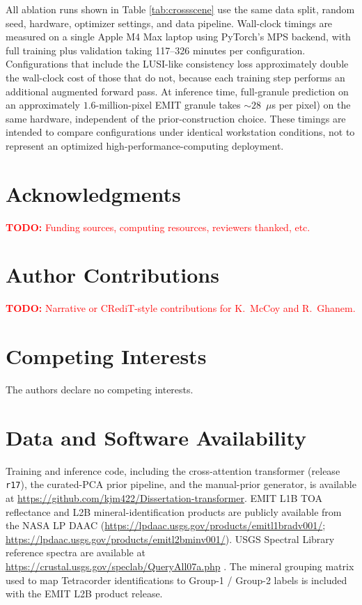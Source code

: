 \documentclass[11pt]{article}
\begin{document}
All ablation runs shown in Table \ref{tab:crossscene} use the same data split, random seed, hardware, optimizer settings, and data pipeline.
Wall-clock timings are measured on a single Apple M4 Max laptop using PyTorch's MPS backend, with full training plus validation taking 117--326 minutes per configuration.
Configurations that include the LUSI-like consistency loss approximately double the wall-clock cost of those that do not, because each training step performs an additional augmented forward pass.
At inference time, full-granule prediction on an approximately $1.6$-million-pixel EMIT granule takes $\sim$$28$~$\mu$s per pixel) on the same hardware, independent of the prior-construction choice.
These timings are intended to compare configurations under identical workstation conditions, not to represent an optimized high-performance-computing deployment.

\section*{Acknowledgments}
\textcolor{red}{\textbf{TODO:} Funding sources, computing resources, reviewers thanked, etc.}

\section*{Author Contributions}
\textcolor{red}{\textbf{TODO:} Narrative or CRediT-style contributions for K.~McCoy and R.~Ghanem.}

\section*{Competing Interests}
The authors declare no competing interests.

\section*{Data and Software Availability}
Training and inference code, including the cross-attention transformer (release \texttt{r17}), the curated-PCA prior pipeline, and the manual-prior generator, is available at \url{https://github.com/kjm422/Dissertation-transformer}.
EMIT L1B TOA reflectance and L2B mineral-identification products are publicly available from the NASA LP DAAC (\url{https://lpdaac.usgs.gov/products/emitl1bradv001/}; \url{https://lpdaac.usgs.gov/products/emitl2bminv001/}).
USGS Spectral Library reference spectra are available at \url{https://crustal.usgs.gov/speclab/QueryAll07a.php} \cite{kokaly2017usgs}.
The mineral grouping matrix used to map Tetracorder identifications to Group-1 / Group-2 labels is included with the EMIT L2B product release.




\end{document}
